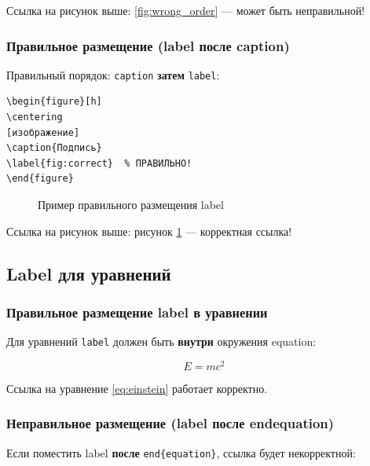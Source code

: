 \documentclass[12pt,a4paper]{article}
\begin{document}
Ссылка на рисунок выше: \ref{fig:wrong_order} — может быть неправильной!

\subsubsection{Правильное размещение (label после caption)}

Правильный порядок: \texttt{caption} \textbf{затем} \texttt{label}:

\begin{verbatim}
\begin{figure}[h]
\centering
[изображение]
\caption{Подпись}
\label{fig:correct}  % ПРАВИЛЬНО!
\end{figure}
\end{verbatim}

\begin{figure}[h]
\centering
{}
\caption{Пример правильного размещения label}
\label{fig:correct_order}
\end{figure}

Ссылка на рисунок выше: рисунок \ref{fig:correct_order} — корректная ссылка!

\subsection{Label для уравнений}

\subsubsection{Правильное размещение label в уравнении}

Для уравнений \texttt{label} должен быть \textbf{внутри} окружения equation:

\begin{equation}
E = mc^2
\label{eq:einstein}
\end{equation}

Ссылка на уравнение \ref{eq:einstein} работает корректно.

\subsubsection{Неправильное размещение (label после end{equation})}

Если поместить label \textbf{после} \texttt{end\{equation\}}, ссылка будет некорректной:
\end{document}
